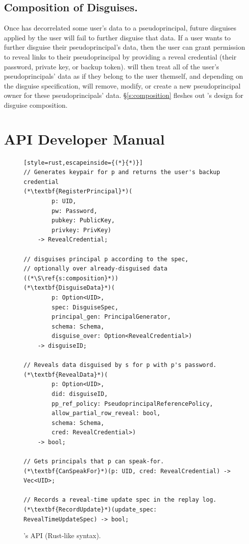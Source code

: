 \subsection{Composition of Disguises.}
Once \sys has decorrelated some user's data to a pseudoprincipal, future
disguises applied by the user will fail to further disguise that
data.
%
If a user wants to further disguise their pseudoprincipal's data,
then the user can grant \sys permission to reveal links to their pseudoprincipal
by providing a reveal credential (their password, private key, or backup token). 
%
\sys will then treat all of the user's pseudoprincipals' data as if they belong
to the user themself, and depending on the disguise specification, will remove,
modify, or create a new pseudoprincipal owner for these pseudoprincipals' data.
%
\S\ref{s:composition} fleshes out \sys's design for disguise composition.

%
\section{API Developer Manual}
\label{s:api}

\begin{figure}[t]
\begin{lstlisting}[style=rust,escapeinside={(*}{*)}]
// Generates keypair for p and returns the user's backup credential
(*\textbf{RegisterPrincipal}*)(
        p: UID, 
        pw: Password,
        pubkey: PublicKey, 
        privkey: PrivKey)
    -> RevealCredential;

// disguises principal p according to the spec, 
// optionally over already-disguised data ((*\S\ref{s:composition}*))
(*\textbf{DisguiseData}*)(
        p: Option<UID>, 
        spec: DisguiseSpec,
        principal_gen: PrincipalGenerator,
        schema: Schema,
        disguise_over: Option<RevealCredential>) 
    -> disguiseID;

// Reveals data disguised by s for p with p's password. 
(*\textbf{RevealData}*)(
        p: Option<UID>, 
        did: disguiseID, 
        pp_ref_policy: PseudoprincipalReferencePolicy,
        allow_partial_row_reveal: bool,
        schema: Schema,
        cred: RevealCredential>)
    -> bool;

// Gets principals that p can speak-for.
(*\textbf{CanSpeakFor}*)(p: UID, cred: RevealCredential) -> Vec<UID>;

// Records a reveal-time update spec in the replay log.
(*\textbf{RecordUpdate}*)(update_spec: RevealTimeUpdateSpec) -> bool;
\end{lstlisting}
\caption{\sys's API (Rust-like syntax).}
\label{f:api-high}
\end{figure}
%

